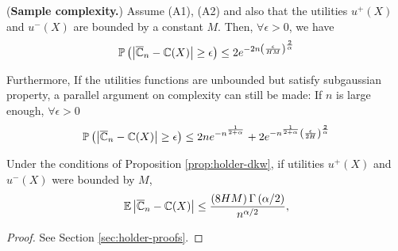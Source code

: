 \begin{proposition}(\textbf{Sample complexity.})
\label{prop:holder-dkw}
Assume (A1), (A2) and also that the utilities $u^+(X)$ and $u^-(X)$  are bounded by a constant $M$. Then, $\forall \epsilon >0$, we have
\begin{align}
\mathbb{P}\left( \left| \overline {\mathbb{C}}_n - \mathbb{C}(X) \right|\geq  \epsilon \right)\leq
2e^{-2n\left(\frac{\epsilon}{HM}\right)^{\frac{2}{\alpha}}}
\label{eq:S-complex-bounded}
\end{align}

Furthermore, If the utilities functions are unbounded but satisfy subgaussian property, a parallel argument on complexity can still be made:  If $n$ is large enough, $\forall \epsilon >0$
\begin{align}
\mathbb{P}\left( \left| \overline {\mathbb{C}}_n - \mathbb{C}(X) \right|\geq  \epsilon \right)\leq 2n e^{-n^\frac{1}{2+\alpha}} 
+ 2 e^{-n^{\frac{1}{2+\alpha}}\left(\frac{\epsilon}{2H}\right)^{\frac{2}{\alpha}}}
\label{eq:S-complex-unbounded}
\end{align}
\end{proposition}

\begin{corollary}
\label{cor:holder-dkw}
Under the conditions of Proposition \ref{prop:holder-dkw}, if utilities $u^+(X)$ and $u^-(X)$ were bounded by $M$, 
$$
\mathbb{E} \left|\overline {\mathbb{C}}_n- \mathbb{C}(X) \right|  \le    \frac{\left(8HM\right) \Gamma\left(\alpha/2\right)}{n^{\alpha/2}},$$
\end{corollary}

\begin{proof}
%
%
See Section \ref{sec:holder-proofs}.
\end{proof}

